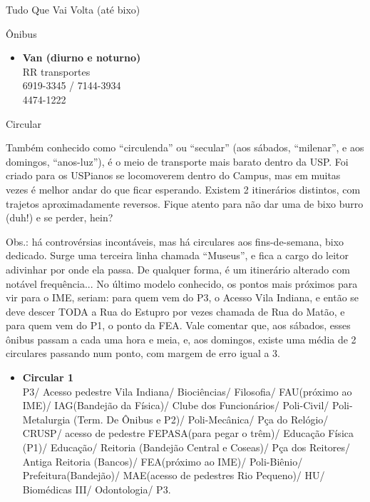 \begin{secao}{Tudo Que Vai Volta (até bixo)}
\begin{subsecao}{Ônibus}
\begin{itemize}
  \item {\bf Van (diurno e noturno)}\\
    RR transportes\\
    6919-3345 / 7144-3934\\
    4474-1222 \\

\end{itemize}

\end{subsecao}

\begin{subsecao}{Circular}

Também conhecido como “circulenda” ou “secular” (aos sábados, “milenar”, e aos domingos, “anos-luz”), é o meio de transporte mais barato dentro da USP. Foi criado para os USPianos se locomoverem dentro do Campus, mas em muitas vezes é melhor andar do que ficar esperando. Existem 2 itinerários distintos, com trajetos aproximadamente reversos. Fique atento para não dar uma de bixo burro (duh!) e se perder, hein? 

Obs.: há controvérsias incontáveis, mas há circulares aos fins-de-semana, bixo dedicado. Surge uma terceira linha chamada “Museus”, e fica a cargo do leitor adivinhar por onde ela passa. De qualquer forma, é um itinerário alterado com notável frequência... No último modelo conhecido, os pontos mais próximos para vir para o IME, seriam: para quem vem do P3, o Acesso Vila Indiana, e então se deve descer TODA a Rua do Estupro por vezes chamada de Rua do Matão, e para quem vem do P1, o ponto da FEA. Vale comentar que, aos sábados, esses ônibus passam a cada uma hora e meia, e, aos domingos, existe uma média de 2 circulares passando num ponto, com margem de erro igual a 3. 


\begin{itemize}
  \item {\bf Circular 1}\\
    P3/ Acesso pedestre Vila Indiana/ Biociências/ Filosofia/
    FAU(próximo ao IME)/ IAG(Bandejão da Física)/ Clube dos Funcionários/
    Poli-Civil/ Poli-Metalurgia (Term. De Ônibus e P2)/ Poli-Mecânica/ Pça do
    Relógio/ CRUSP/ acesso de pedestre FEPASA(para pegar o trêm)/ Educação
    Física (P1)/ Educação/ Reitoria (Bandejão Central e Coseas)/ Pça dos
    Reitores/ Antiga Reitoria (Bancos)/ FEA(próximo ao IME)/ Poli-Biênio/
    Prefeitura(Bandejão)/ MAE(acesso de pedestres Rio Pequeno)/ HU/ Biomédicas
    III/ Odontologia/ P3.


\end{itemize}
\end{subsecao}
\end{secao}

